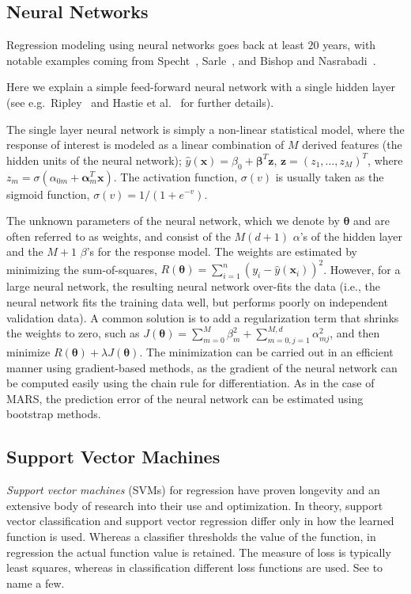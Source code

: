 \subsection{Neural Networks}
Regression modeling using neural networks goes back at least $20$ years, with notable examples coming from Specht~\cite{Specht1991}, Sarle~\cite{Sarle1994}, and Bishop and Nasrabadi~\cite{BishopNasrabadi2006}.

Here we explain a simple feed-forward neural network with a single hidden layer (see e.g.\ Ripley~\cite{Ripley1996} and Hastie et al.~\cite{HastieTibshiraniFriedman2008} for further details).

The single layer neural network is simply a non-linear statistical model, where the response of interest is modeled as a linear combination of $M$ derived features (the hidden units of the neural network);
%
$\hat{y}(\mathbf{x}) = \beta_0 + \mathbf{\beta}^T \mathbf{z}$, $\mathbf{z} = (z_1, \dots, z_M)^T$, where $z_m = \sigma(\alpha_{0m} + \mathbf{\alpha}_m^T \mathbf{x})$.
%
The activation function, $\sigma(v)$ is usually taken as the sigmoid function, $\sigma(v) = 1/(1+e^{-v})$.

The unknown parameters of the neural network, which we denote by $\mathbf{\theta}$ and are often referred to as weights, and consist of the $M(d+1)$ $\alpha$'s of the hidden layer and the $M+1$ $\beta$'s for the response model.
%
The weights are estimated by minimizing the sum-of-squares, $R(\mathbf{\theta}) = \sum_{i=1}^n (y_i - \hat{y}(\mathbf{x}_i))^2$.
%
However, for a large neural network, the resulting neural network over-fits the data (i.e., the neural network fits the training data well, but performs poorly on independent validation data).
%
A common solution is to add a regularization term that shrinks the weights to zero, such as $J(\mathbf{\theta}) = \sum_{m=0}^M \beta_{m}^2 + \sum_{m=0,j=1}^{M,d} \alpha_{mj}^2$, and then minimize $R(\mathbf{\theta}) + \lambda J(\mathbf{\theta})$.
%
The minimization can be carried out in an efficient manner using gradient-based methods, as the gradient of the neural network can be computed easily using the chain rule for differentiation.
%
As in the case of MARS, the prediction error of the neural network can be estimated using bootstrap methods.

\subsection{Support Vector Machines}
\emph{Support vector machines} (SVMs) for regression have proven longevity and an extensive body of research into their use and optimization.
%
In theory, support vector classification and support vector regression differ only in how the learned function is used.
%
Whereas a classifier thresholds the value of the function, in regression the actual function value is retained.
%
The measure of loss is typically least squares, whereas in classification different loss functions are used.
%
See \cite{SmolaScholkopf2004,SuykensVandewalle1999,SuykensDeBrabanterLukas2002, DruckerBurgesKaufman1997} to name a few.


